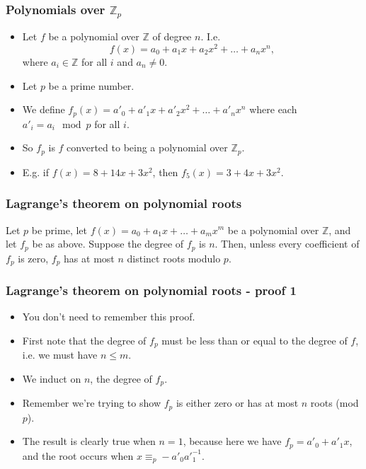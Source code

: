 \documentclass[handout]{beamer}
\newcommand{\bZ}{\mathbb{Z}}
\begin{document}
\begin{frame}
\frametitle{Polynomials over $\bZ_p$}
\begin{itemize}
\item Let $f$ be a polynomial over $\bZ$ of degree $n$. I.e. 
\[f(x)= a_0 + a_1 x + a_2 x^2 +\ldots + a_n x^n,\]
where $a_i\in\bZ$ for all $i$ and $a_n\neq 0$.
\vspace{0.5cm} 
\item Let $p$ be a prime number. 
\vspace{0.5cm} 
\item We define $f_p(x) = a'_0 + a'_1 x + a'_2 x^2 +\ldots + a'_n x^n$ where each $a'_i = a_i\mod p$ for all $i$. 
\vspace{0.5cm} 
\item So $f_p$ is $f$ converted to being a polynomial over $\bZ_p$. 
\vspace{0.5cm} 
\item E.g. if $f(x) = 8 + 14x +3x^2$, then $f_5(x) = 3 + 4x + 3x^2$.
\end{itemize}
\end{frame}

\begin{frame}
\frametitle{Lagrange's theorem on polynomial roots}
\begin{theorem}[Lagrange]
Let $p$ be prime, let $f(x) = a_0 + a_1x +\ldots + a_m x^m$ be a polynomial over $\bZ$, and let $f_p$ be as above. Suppose the degree of $f_p$ is $n$. Then, unless every coefficient of $f_p$ is zero, $f_p$ has at most $n$ distinct roots modulo $p$. 
\end{theorem}

\end{frame}

\begin{frame}
\frametitle{Lagrange's theorem on polynomial roots - proof 1}

\begin{itemize}
\item You don't need to remember this proof. 
\vspace{0.5cm} 
\item First note that the degree of $f_p$ must be less than or equal to the degree of $f$, i.e. we must have $n\leq m$. 
\vspace{0.5cm} 
\item We induct on $n$, the degree of $f_p$. 
\vspace{0.5cm} 
\item Remember we're trying to show $f_p$ is either zero or has at most $n$ roots (mod $p$).
\vspace{0.5cm} 
\item The result is clearly true when $n=1$, because here we have $f_p = a'_0 + a'_1x$, and the root occurs when $x \equiv_p -a'_0a'^{-1}_1$. 
\end{itemize}
\end{frame}
\end{document}
